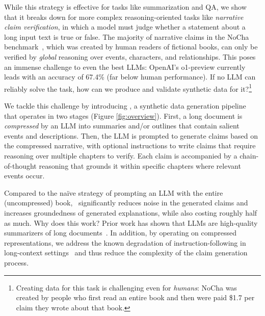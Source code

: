 While this strategy is effective for tasks like summarization and QA, we show that it breaks down for more complex reasoning-oriented tasks like \emph{narrative claim verification}, in which a model must judge whether a statement about a long input text is true or false.
The majority of narrative claims in the NoCha benchmark~\cite{karpinska_one_2024}, which was created by human readers of fictional books, can only be verified by \emph{global} reasoning over events, characters, and relationships.  This poses an immense challenge to even the best LLMs: OpenAI's o1-preview currently leads with an accuracy of 67.4\% (far below human performance). If no LLM can reliably solve the task, how can we produce and validate synthetic data for it?\footnote{Creating data for this task is challenging even for \emph{humans}: NoCha was created by people who first read an entire book and then were paid \$1.7 per claim they wrote about that book.} 

We tackle this challenge by introducing \pipeline, a synthetic data generation pipeline that operates in two stages (Figure \ref{fig:overview}). First, a long document is \emph{compressed} by an LLM into summaries and/or outlines that contain salient events and descriptions. Then, the LLM is prompted to generate claims based on the compressed narrative, with optional instructions to write claims that require reasoning over multiple chapters to verify. Each claim is accompanied by a chain-of-thought reasoning that grounds it within specific chapters where relevant events occur.

Compared to the na\"ive strategy of prompting an LLM with the entire (uncompressed) book, \pipeline\ significantly reduces noise in the generated claims and increases groundedness of generated explanations, while also costing roughly half as much. Why does this work? Prior work has shown that LLMs are high-quality summarizers of long documents~\cite{chang_booookscore_2024, kim_fables_2024}. In addition, by operating on compressed representations, we address the known degradation of instruction-following in long-context settings~\cite{wu_lifbench_2024, levy_same_2024} and thus reduce the complexity of the claim generation process.


